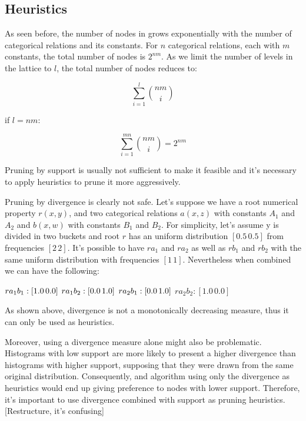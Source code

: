 \subsection{Heuristics}

As seen before, the number of nodes in \graphname grows exponentially with the number of categorical relations
and its constants. For $n$ categorical relations, each with $m$ constants, the total number of nodes is $2^{nm}$. As we
limit the number of levels in the lattice to $l$, the total number of nodes reduces to:

\begin{center}
  \begin{equation}
    \sum_{i=1}^{l}\binom{nm}{i}
  \end{equation}
\end{center}

if $l=nm$:

\begin{center}
  \begin{equation}
    \sum_{i=1}^{mn}\binom{nm}{i} = 2^{nm}
  \end{equation}
\end{center}


Pruning by support is usually not sufficient to make it feasible and it's necessary to apply
heuristics to prune it more aggressively.


Pruning by divergence is clearly not safe. Let's suppose we have a root numerical property $r(x,y)$, and two categorical
relations $a(x,z)$ with constants $A_1$ and $A_2$ and $b(x,w)$ with constants $B_1$ and $B_2$. For simplicity, let's
assume y is divided in two buckets and root $r$ has an uniform distribution $[0.5 \, 0.5]$ from frequencies $[2 \, 2]$.
It's possible to have $r a_1$ and $r a_2$ as well as $r b_1$ and $r b_2$ with the same uniform distribution with
frequencies $[1 \, 1]$. Nevertheless when combined we can have the following:

$r a_1 b_1 : [1.0 \, 0.0] \\$
$r a_1 b_2 : [0.0 \, 1.0] \\$
$r a_2 b_1 : [0.0 \, 1.0] \\$
$r a_2 b_2 : [1.0 \, 0.0]$

As shown above, divergence is not a monotonically decreasing measure, thus it can only be used as heuristics.


Moreover, using a divergence measure alone might also be problematic. Histograms with low support are more likely to
present a higher divergence than histograms with higher support, supposing that they were drawn from the same original
distribution. Consequently, and algorithm using only the divergence as heuristics would end up giving preference to
nodes with lower support. Therefore, it's important to use divergence combined with support as pruning heuristics.
[Restructure, it's confusing]

